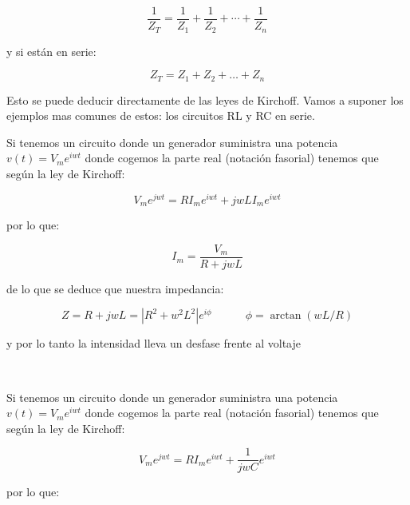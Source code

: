 \documentclass[12pt,a4paper]{article}
\newcommand{\tquad}{\quad \quad \quad}
\begin{document}
\begin{equation}
\dfrac{1}{Z_T} = \dfrac{1}{Z_1} + \dfrac{1}{Z_2} + \cdots + \dfrac{1}{Z_n}
\end{equation}

y si están en serie:

\begin{equation}
Z_T = Z_1 + Z_2 + \ldots + Z_n
\end{equation}

Esto se puede deducir directamente de las leyes de Kirchoff. Vamos a suponer los ejemplos mas comunes de estos: los circuitos RL y RC en serie.  \\


\hrulefill

Si tenemos un circuito donde un generador suministra una potencia $v(t) = V_m e^{iwt}$ donde cogemos la parte real (notación fasorial) tenemos que según la ley de Kirchoff:

\begin{equation}
V_m e^{jwt} = R I_m e^{iwt} + jwLI_m e^{iwt} 
\end{equation}

por lo que:



\begin{equation}
I_m = \dfrac{V_m}{R + jwL}
\end{equation}

de lo que se deduce que nuestra impedancia:

\begin{equation}
Z = R + jwL = |R^2 + w^2 L^2| e^{i \phi} \tquad \phi = \arctan(wL/R)
\end{equation}

y por lo tanto la intensidad lleva un desfase frente al voltaje

\hrulefill \\



\hrulefill 

Si tenemos un circuito donde un generador suministra una potencia $v(t) = V_m e^{iwt}$ donde cogemos la parte real (notación fasorial) tenemos que según la ley de Kirchoff:

\begin{equation}
V_m e^{jwt} = R I_m e^{iwt} + \dfrac{1}{jwC} e^{iwt} 
\end{equation}

por lo que:
\end{document}

